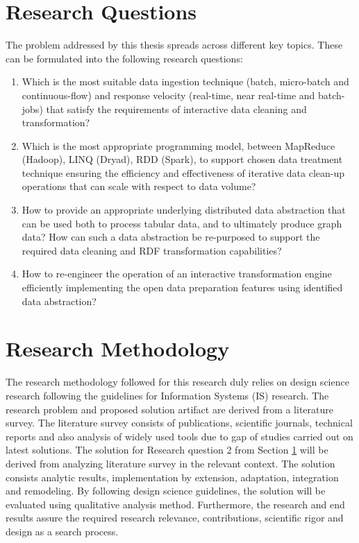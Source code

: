 \section{Research Questions}
\label{sec:reseach-ques}
\noindent The problem addressed by this thesis spreads across different key topics. These can be formulated into the following research questions:
\begin{enumerate}
\item Which is the most suitable data ingestion technique (batch, micro-batch and continuous-flow) and response velocity (real-time, near real-time and batch-jobs) that satisfy the requirements of interactive data cleaning and transformation?
\item Which is the most appropriate programming model, between MapReduce (Hadoop), LINQ (Dryad), RDD (Spark), to support chosen data treatment technique ensuring the efficiency and effectiveness of iterative data clean-up operations that can scale with respect to data volume?
\item How to provide an appropriate underlying distributed data abstraction that can be used both to process tabular data, and to ultimately produce graph data? How can such a data abstraction be re-purposed to support the required data cleaning and RDF transformation capabilities?
\item How to re-engineer the operation of an interactive transformation engine efficiently implementing the open data preparation features using identified data abstraction?
\end{enumerate}

\section{Research Methodology}
The research methodology followed for this research duly relies on design science \cite{von2004design} research following the guidelines for Information Systems (IS) research. The research problem and proposed solution artifact are derived from a literature survey. The literature survey consists of publications, scientific journals, technical reports and also analysis of widely used tools due to gap of studies carried out on latest solutions. The solution for Research question 2 from Section \ref{sec:reseach-ques} will be derived from analyzing literature survey in the relevant context. The solution consists analytic results, implementation by extension, adaptation, integration and remodeling.  By following design science guidelines, the solution will be evaluated using qualitative analysis method. Furthermore, the research and end results assure the  required research relevance, contributions, scientific rigor and design as a search process. 
